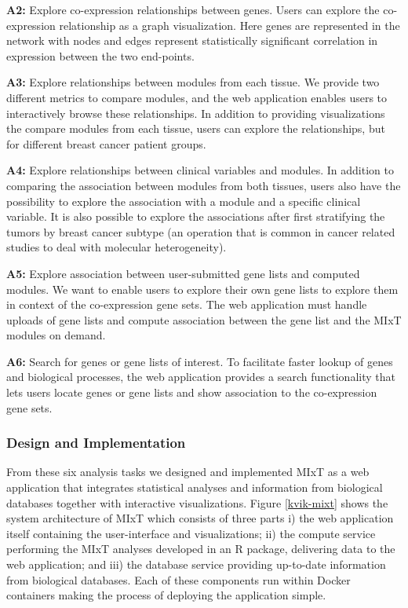 \textbf{A2:} Explore co-expression relationships between genes. Users can
explore the co-expression relationship as a graph visualization. 
Here genes are represented in the network with nodes and edges represent 
statistically significant correlation in expression between the two end-points. 

\textbf{A3:} Explore relationships between modules from each tissue. We provide
two different metrics to compare modules, and the web application enables users
to interactively browse these relationships.  In addition to providing
visualizations the compare modules from each tissue, users can explore the
relationships, but for different breast cancer patient groups. 

\textbf{A4:} Explore relationships between clinical variables and modules. In
addition to comparing the association between modules from both tissues, users
also have the possibility to explore the association with a module and a
specific clinical variable. It is also possible to explore the associations
after first stratifying the tumors by breast cancer subtype (an operation that
is common in cancer related studies to deal with molecular heterogeneity).

\textbf{A5:} Explore association between user-submitted gene lists and computed
modules. We want to enable users to explore their own gene lists to explore
them in context of the co-expression gene sets. The web application must handle
uploads of gene lists and compute association between the gene list and the MIxT
modules on demand. 

\textbf{A6:} Search for genes or gene lists of interest. To facilitate faster
lookup of genes and biological processes, the web application provides a search
functionality that lets users locate genes or gene lists and show association to
the co-expression gene sets. 

\subsubsection{Design and Implementation} 
From these six analysis tasks we designed and implemented MIxT as a web
application that integrates statistical analyses and information from biological
databases together with interactive visualizations. Figure \ref{kvik-mixt} shows
the system architecture of MIxT which consists of three parts i) the
web application itself containing the user-interface and visualizations; ii) the
compute service performing the MIxT analyses developed in an R package,
delivering data to the web application; and iii) the database service providing
up-to-date information from biological databases.  Each of these components run
within Docker containers making the process of deploying the application simple. 

